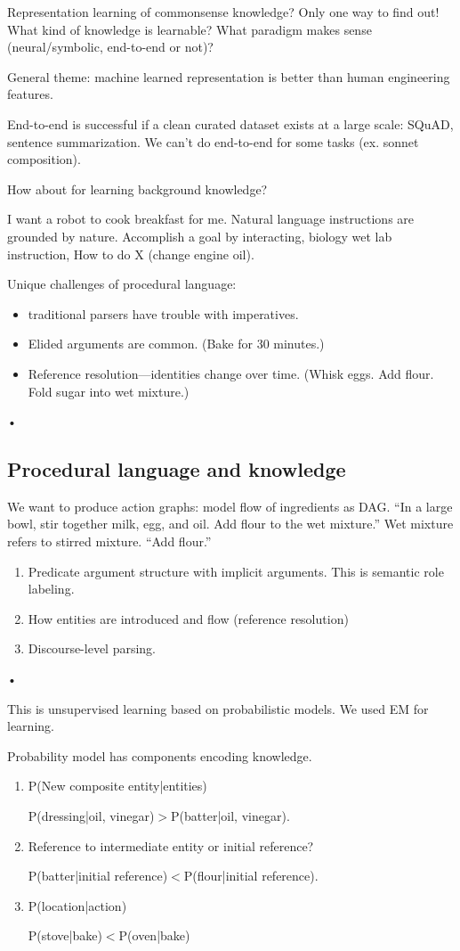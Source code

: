 Representation learning of commonsense knowledge? 
Only one way to find out!
What kind of knowledge is learnable? What paradigm makes sense (neural/symbolic, end-to-end or not)?

General theme: machine learned representation is better than human engineering features.

End-to-end is successful if a clean curated dataset exists at a large scale: SQuAD, sentence summarization. We can't do end-to-end for some tasks (ex. sonnet composition). 

How about for learning background knowledge?

I want a robot to cook breakfast for me. Natural language instructions are grounded by nature. Accomplish a goal by interacting, biology wet lab instruction, How to do X (change engine oil).

Unique challenges of procedural language:
\begin{itemize}
\item
traditional parsers have trouble with imperatives.
\item
Elided arguments are common. (Bake for 30 minutes.)
\item
Reference resolution---identities change over time. (Whisk eggs. Add flour. Fold sugar into wet mixture.)
\end{itemize}•

\subsection{Procedural language and knowledge}

We want to produce action graphs: model flow of ingredients as DAG. ``In a large bowl, stir together milk, egg, and oil. Add flour to the wet mixture.'' Wet mixture refers to stirred mixture. ``Add flour.'' 
\begin{enumerate}
\item
Predicate argument structure with implicit arguments. This is semantic role labeling.
\item
How entities are introduced and flow (reference resolution)
\item
Discourse-level parsing.
\end{enumerate}•

This is unsupervised learning based on probabilistic models. We used EM for learning. 

Probability model has components encoding knowledge.
\begin{enumerate}
\item P(New composite entity|entities)

P(dressing|oil, vinegar)$>$P(batter|oil, vinegar).
\item
Reference to intermediate entity or initial reference?

P(batter|initial reference)$<$P(flour|initial reference).
\item
P(location|action)

P(stove|bake)$<$P(oven|bake)
\end{enumerate}

